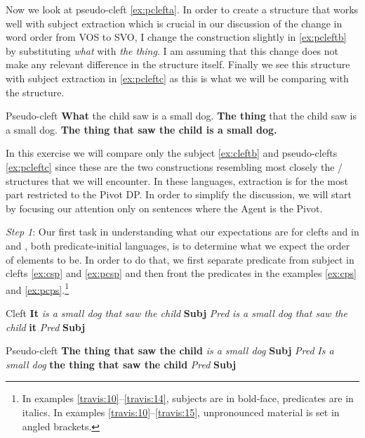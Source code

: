 \documentclass[output=paper]{langsci/langscibook}
\begin{document}
Now we look at pseudo-cleft \eqref{ex:pclefta}.  In order to create a structure
that works well with subject extraction which is crucial in our discussion of
the change in word order from VOS to SVO, I change the construction slightly in
\eqref{ex:pcleftb} by substituting \emph{what} with \emph{the thing}.  I am
assuming that this change does not make any relevant difference in the
structure itself.  Finally we see this structure with subject extraction in
\eqref{ex:pcleftc} as this is what we will be comparing with the 
structure.

\ea  Pseudo-cleft
    \ea \textbf{What} the child saw is a small dog.\label{ex:pclefta}
    \ex \textbf{The thing} that the child saw is a small dog. \label{ex:pcleftb}
    \ex \textbf{The thing that saw the child is a small dog.\label{ex:pcleftc}}
    \z
\z

In this exercise we will compare only the subject  \eqref{ex:cleftb} and
pseudo-clefts \eqref{ex:pcleftc} since these are the two constructions resembling
most closely the / structures that we will encounter.  In these
languages, extraction is for the most part restricted to the Pivot DP.  In
order to simplify the discussion, we will start by focusing our attention only
on sentences where the Agent is the Pivot.

\textit{Step 1}:  Our first task in understanding what our expectations are for
clefts and  in  and , both predicate-initial
languages, is to determine what we expect the order of elements to be.  In
order to do that, we first separate predicate from subject in clefts
\eqref{ex:csp} and  \eqref{ex:pcsp} and then front the
predicates in the  examples \eqref{ex:cps} and
\eqref{ex:pcps}.\footnote{In examples
\eqref{travis:10}--\eqref{travis:14}, subjects are in bold-face, predicates are
in italics. In examples \eqref{travis:10}--\eqref{travis:15}, unpronounced
material is set in angled brackets.}

\ea\label{travis:10} Cleft
    \ea \textbf{It}  \emph{is a small dog that saw the child}\label{ex:csp} \hfill \textbf{Subj} \emph{Pred}
     \ex \emph{is a small dog that saw the child } \textbf{it}\label{ex:cps} \hfill \emph{Pred} \textbf{Subj}
    \z
\z

\ea  Pseudo-cleft
    \ea  \textbf{The thing that saw the child }  \emph{is a small dog}\label{ex:pcsp} \hfill \textbf{Subj} \emph{Pred}
     \ex \emph{Is a small dog} \textbf{the thing that saw the child} \label{ex:pcps} \hfill \emph{Pred} \textbf{Subj}
    \z
\z
\end{document}
